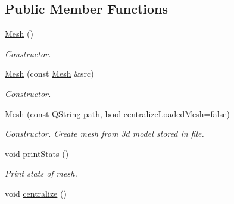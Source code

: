 \subsection*{Public Member Functions}
\begin{DoxyCompactItemize}
\item 
\hypertarget{class_mesh_a2af137f1571af89172b9c102302c416b}{\hyperlink{class_mesh_a2af137f1571af89172b9c102302c416b}{Mesh} ()}\label{class_mesh_a2af137f1571af89172b9c102302c416b}

\begin{DoxyCompactList}\small\item\em Constructor. \end{DoxyCompactList}\item 
\hyperlink{class_mesh_a364ba4b2fd09e26795e68f9aa9c46d7d}{Mesh} (const \hyperlink{class_mesh}{Mesh} \&src)
\begin{DoxyCompactList}\small\item\em Constructor. \end{DoxyCompactList}\item 
\hyperlink{class_mesh_a4b17a8a6b16ef6751e30d7efab345ebf}{Mesh} (const Q\+String path, bool centralize\+Loaded\+Mesh=false)
\begin{DoxyCompactList}\small\item\em Constructor. Create mesh from 3d model stored in file. \end{DoxyCompactList}\item 
\hypertarget{class_mesh_a38a2694f262d993b4b50f53e20599031}{void \hyperlink{class_mesh_a38a2694f262d993b4b50f53e20599031}{print\+Stats} ()}\label{class_mesh_a38a2694f262d993b4b50f53e20599031}

\begin{DoxyCompactList}\small\item\em Print stats of mesh. \end{DoxyCompactList}\item 
\hypertarget{class_mesh_aa34d69f670ed6e1ebc101062dee17ad4}{void \hyperlink{class_mesh_aa34d69f670ed6e1ebc101062dee17ad4}{centralize} ()}\label{class_mesh_aa34d69f670ed6e1ebc101062dee17ad4}


\end{DoxyCompactItemize}
